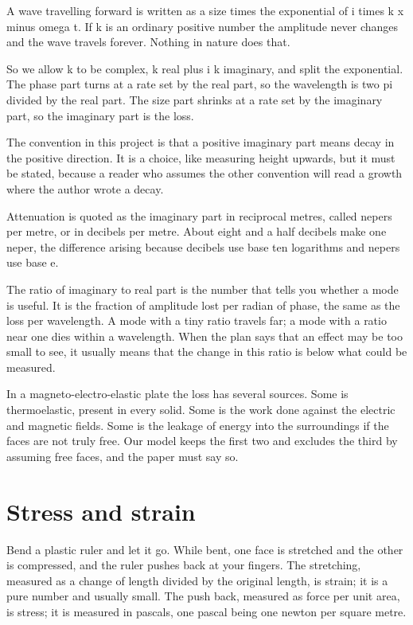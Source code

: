 \documentclass[11pt]{article}
\begin{document}
A wave travelling forward is written as a size times the exponential of i times k x minus omega t. If k is an
ordinary positive number the amplitude never changes and the wave travels forever. Nothing in nature does
that.

So we allow k to be complex, k real plus i k imaginary, and split the exponential. The phase part turns at a
rate set by the real part, so the wavelength is two pi divided by the real part. The size part shrinks at a
rate set by the imaginary part, so the imaginary part is the loss.

The convention in this project is that a positive imaginary part means decay in the positive direction. It is
a choice, like measuring height upwards, but it must be stated, because a reader who assumes the other
convention will read a growth where the author wrote a decay.

Attenuation is quoted as the imaginary part in reciprocal metres, called nepers per metre, or in decibels per
metre. About eight and a half decibels make one neper, the difference arising because decibels use base ten
logarithms and nepers use base e.

The ratio of imaginary to real part is the number that tells you whether a mode is useful. It is the fraction
of amplitude lost per radian of phase, the same as the loss per wavelength. A mode with a tiny ratio travels
far; a mode with a ratio near one dies within a wavelength. When the plan says that an effect may be too small
to see, it usually means that the change in this ratio is below what could be measured.

In a magneto-electro-elastic plate the loss has several sources. Some is thermoelastic, present in every
solid. Some is the work done against the electric and magnetic fields. Some is the leakage of energy into the
surroundings if the faces are not truly free. Our model keeps the first two and excludes the third by
assuming free faces, and the paper must say so.

\section{Stress and strain}

Bend a plastic ruler and let it go. While bent, one face is stretched and the other is compressed, and the
ruler pushes back at your fingers. The stretching, measured as a change of length divided by the original
length, is strain; it is a pure number and usually small. The push back, measured as force per unit area, is
stress; it is measured in pascals, one pascal being one newton per square metre.
\end{document}

